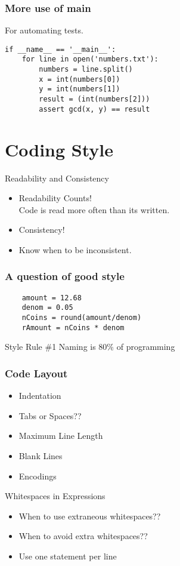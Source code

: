 \documentclass[compress,14pt]{beamer}
\begin{document}
\begin{frame}[fragile]
  \frametitle{More use of main}
  For automating tests.
  \begin{lstlisting}
if __name__ == '__main__':
    for line in open('numbers.txt'):
        numbers = line.split()
        x = int(numbers[0])
        y = int(numbers[1])
        result = (int(numbers[2]))
        assert gcd(x, y) == result
  \end{lstlisting}  
\end{frame}

\section{Coding Style}
\begin{frame}{Readability and Consistency}
    \begin{itemize}
        \item Readability Counts!\\Code is read more often than its written.
        \item Consistency!
        \item Know when to be inconsistent.
      \end{itemize}
\end{frame}

\begin{frame}[fragile] \frametitle{A question of good style}
  \begin{lstlisting}
    amount = 12.68
    denom = 0.05
    nCoins = round(amount/denom)
    rAmount = nCoins * denom
  \end{lstlisting}
  \pause
  \begin{block}{Style Rule \#1}
    Naming is 80\% of programming
  \end{block}
\end{frame}

\begin{frame}[fragile]
  \frametitle{Code Layout}
  \begin{itemize}
        \item Indentation
        \item Tabs or Spaces??
        \item Maximum Line Length
        \item Blank Lines
        \item Encodings
   \end{itemize}
\end{frame}

\begin{frame}{Whitespaces in Expressions}
  \begin{itemize}
        \item When to use extraneous whitespaces??
        \item When to avoid extra whitespaces??
        \item Use one statement per line
   \end{itemize}
\end{frame}
\end{document}

